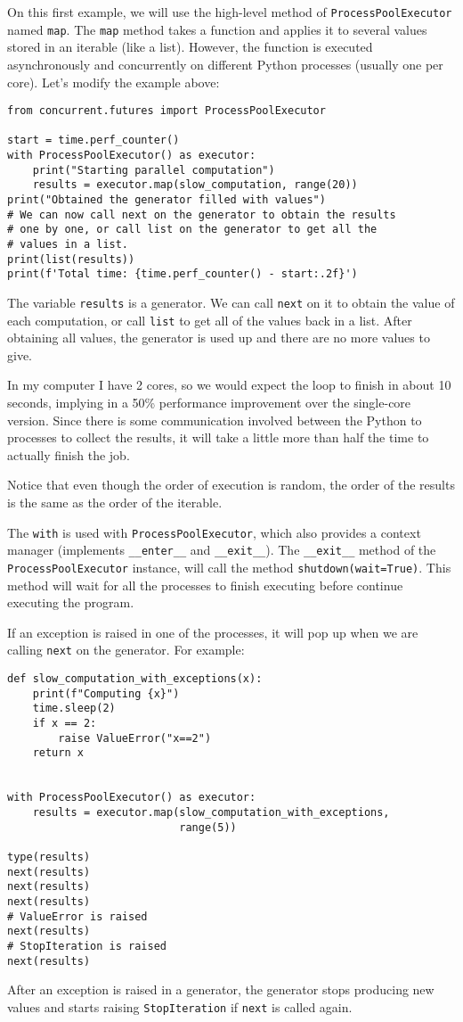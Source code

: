 \documentclass[12pt, a4paper]{article}
\begin{document}
On this first example, we will use the high-level method of \texttt{ProcessPoolExecutor} named \texttt{map}.
The \texttt{map} method takes a function and applies it to several values stored in an iterable (like a list).
However, the function is executed asynchronously and concurrently on different Python processes (usually one per core).
Let's modify the example above:
\lstset{language=jupyter-python,label= ,caption= ,captionpos=b,numbers=none}
\begin{lstlisting}
from concurrent.futures import ProcessPoolExecutor

start = time.perf_counter()
with ProcessPoolExecutor() as executor:
    print("Starting parallel computation")
    results = executor.map(slow_computation, range(20))
print("Obtained the generator filled with values")
# We can now call next on the generator to obtain the results
# one by one, or call list on the generator to get all the
# values in a list.
print(list(results))
print(f'Total time: {time.perf_counter() - start:.2f}')
\end{lstlisting}
The variable \texttt{results} is a generator.
We can call \texttt{next} on it to obtain the value of each computation, or call \texttt{list} to get all of the values back in a list.
After obtaining all values, the generator is used up and there are no more values to give.

In my computer I have 2 cores, so we would expect the loop to finish in about 10 seconds, implying in a 50\% performance improvement over the single-core version.
Since there is some communication involved between the Python to processes to collect the results, it will take a little more than half the time to actually finish the job.

Notice that even though the order of execution is random, the order of the results is the same as the order of the iterable.

The \texttt{with} is used with \texttt{ProcessPoolExecutor}, which also provides a context manager (implements \texttt{\_\_enter\_\_} and \texttt{\_\_exit\_\_}).
The \texttt{\_\_exit\_\_} method of the \texttt{ProcessPoolExecutor} instance, will call the method \texttt{shutdown(wait=True)}. This method will wait for all the processes to finish executing before continue executing the program.

If an exception is raised in one of the processes, it will pop up when we are calling \texttt{next} on the generator.
For example:
\lstset{language=jupyter-python,label= ,caption= ,captionpos=b,numbers=none}
\begin{lstlisting}
def slow_computation_with_exceptions(x):
    print(f"Computing {x}")
    time.sleep(2)
    if x == 2:
        raise ValueError("x==2")
    return x


with ProcessPoolExecutor() as executor:
    results = executor.map(slow_computation_with_exceptions,
                           range(5))

type(results)
next(results)
next(results)
next(results)
# ValueError is raised
next(results)
# StopIteration is raised
next(results)
\end{lstlisting}
After an exception is raised in a generator, the generator stops producing new values and starts raising \texttt{StopIteration} if \texttt{next} is called again.
\end{document}
